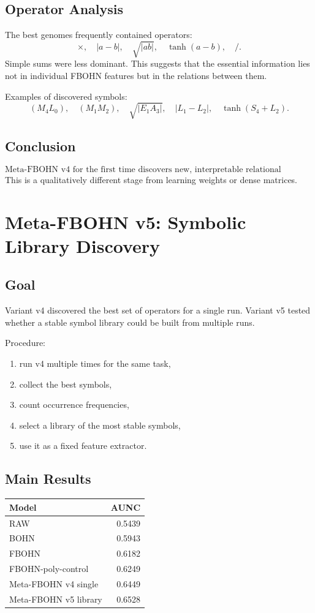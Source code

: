 \documentclass[11pt,a4paper]{report}
\begin{document}
\subsection{Operator Analysis}
The best genomes frequently contained operators:
\[
\times,\quad |a-b|,\quad \sqrt{|ab|},\quad \tanh(a-b),\quad /.
\]
Simple sums were less dominant. This suggests that the essential information lies not in individual FBOHN features but in the relations between them.

Examples of discovered symbols:
\[
(M_4L_0),\quad (M_1M_2),\quad \sqrt{|E_1A_3|},\quad |L_1-L_2|,
\quad \tanh(S_4+L_2).
\]

\subsection{Conclusion}
\[
\boxed{\text{Meta-FBOHN v4 for the first time discovers new, interpretable relational operators.}}
\]
This is a qualitatively different stage from learning weights or dense matrices.


\section{Meta-FBOHN v5: Symbolic Library Discovery}
\label{sec:meta_fbohn_v5}

\subsection{Goal}
Variant v4 discovered the best set of operators for a single run. Variant v5 tested whether a stable symbol library could be built from multiple runs.

Procedure:
\begin{enumerate}
\item run v4 multiple times for the same task,
\item collect the best symbols,
\item count occurrence frequencies,
\item select a library of the most stable symbols,
\item use it as a fixed feature extractor.
\end{enumerate}

\subsection{Main Results}
\begin{center}
\begin{tabular}{lr}
\toprule
Model & AUNC\\
\midrule
RAW & 0.5439\\
BOHN & 0.5943\\
FBOHN & 0.6182\\
FBOHN-poly-control & 0.6249\\
Meta-FBOHN v4 single & 0.6449\\
Meta-FBOHN v5 library & 0.6528\\
\bottomrule
\end{tabular}
\end{center}
\end{document}
